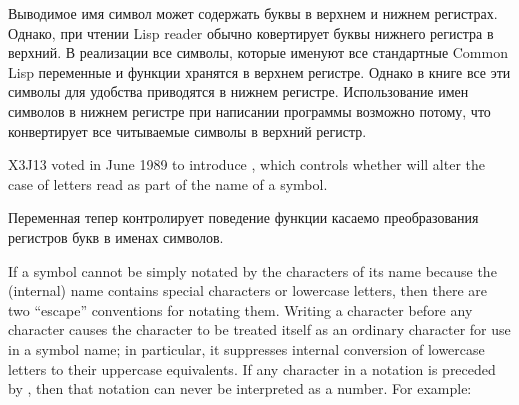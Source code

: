 Выводимое имя символ может содержать буквы в верхнем и нижнем регистрах.
Однако, при чтении Lisp reader обычно ковертирует буквы нижнего регистра в
верхний.
В реализации все символы, которые именуют все стандартные Common Lisp переменные
и функции хранятся в верхнем регистре. Однако в книге все эти символы для
удобства приводятся в нижнем регистре. Использование имен символов в нижнем
регистре при написании программы возможно потому, что  конвертирует все
читываемые символы в верхний регистр.

\begin{newer}
X3J13 voted in June 1989  to introduce
, which controls whether  will alter the case
of letters read as part of the name of a symbol.

Переменная  тепер контролирует поведение функции 
касаемо преобразования регистров букв в именах символов.
\end{newer}

If a symbol cannot be simply notated by the characters of its name
because the (internal) name contains special characters or lowercase letters,
then there are two ``escape'' conventions for notating them.
Writing a \cd{{\Xbackslash}} character before any character causes the character
to be treated itself as an ordinary character for use in a symbol name;
in particular, it suppresses internal conversion of lowercase letters
to their uppercase equivalents.
If any character in a notation is preceded by \cd{{\Xbackslash}}, then that
notation can never be interpreted as a number.
For example:


